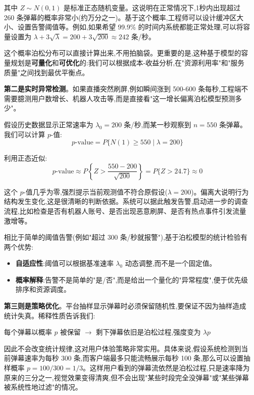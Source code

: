 \documentclass[12pt,a4paper]{article}
\begin{document}
其中 $Z \sim N(0,1)$ 是标准正态随机变量。这说明在正常情况下,1秒内出现超过 260 条弹幕的概率非常小(约万分之一)。基于这个概率,工程师可以设计缓冲区大小、设置告警阈值等。例如,如果希望 99.9\% 的时间内系统都能正常处理,可以将容量设置为 $\lambda + 3\sqrt{\lambda} = 200 + 3\sqrt{200} \approx 242$ 条/秒。

这个概率泊松分布可以直接计算出来,不用拍脑袋。更重要的是,这种基于模型的容量规划是\textbf{可量化}和\textbf{可优化}的:我们可以根据成本-收益分析,在"资源利用率"和"服务质量"之间找到最优平衡点。

\textbf{第二是实时异常检测}。如果直播突然刷屏,例如瞬间涨到 500-600 条每秒,工程端不需要臆测用户数增长、机器人攻击等,而是直接看"这一增长偏离泊松模型预测多少"。

假设历史数据显示正常速率为 $\lambda_0 = 200$ 条/秒,而某一秒观察到 $n = 550$ 条弹幕。我们可以计算 $p$-值:
\begin{equation}
p\text{-value} = P\{N(1) \geq 550 \mid \lambda = 200\}
\end{equation}

利用正态近似:
\begin{equation}
p\text{-value} \approx P\left\{Z > \frac{550-200}{\sqrt{200}}\right\} = P\{Z > 24.7\} \approx 0
\end{equation}

这个 $p$-值几乎为零,强烈提示当前观测值不符合原假设($\lambda = 200$)。偏离大说明行为结构发生变化,这是很清晰的判断依据。系统可以据此触发告警,启动进一步的调查流程,比如检查是否有机器人账号、是否出现恶意刷屏、是否有热点事件引发流量激增等。

相比于简单的阈值告警(例如"超过 300 条/秒就报警"),基于泊松模型的统计检验有两个优势:
\begin{itemize}
\item \textbf{自适应性}:阈值可以根据基准速率 $\lambda_0$ 动态调整,而不是一个固定值。
\item \textbf{概率解释}:告警不是简单的"是/否",而是给出一个量化的"异常程度",便于优先级排序和资源调度。
\end{itemize}

\textbf{第三则是策略优化}。平台抽样显示弹幕时必须保留随机性,要保证不因为抽样造成统计失真。稀释性质告诉我们:

\begin{center}
每个弹幕以概率 $p$ 被保留 $\rightarrow$ 剩下弹幕依旧是泊松过程,强度变为 $\lambda p$
\end{center}

因此不会改变统计规律,这对用户体验策略非常实用。具体来说,假设系统检测到当前弹幕速率为每秒 300 条,而客户端最多只能流畅展示每秒 100 条,那么可以设置抽样概率 $p = 100/300 = 1/3$。这样用户看到的弹幕流依然是泊松过程,只是速率降为原来的三分之一,视觉效果变得清爽,但不会出现"某些时段完全没弹幕"或"某些弹幕被系统性地过滤"的情况。
\end{document}
